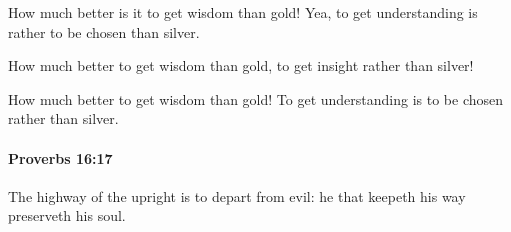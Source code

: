 			\begin{versebox}
					\item[BHS] 
					\item[ASV] How much better is it to get wisdom than gold! Yea, to get understanding is rather to be chosen than silver.
					\item[NIV] How much better to get wisdom than gold, to get insight rather than silver!
					\item[NRSV] How much better to get wisdom than gold! To get understanding is to be chosen rather than silver.
			\end{versebox}

		\paragraph{Proverbs 16:17} %
			\label{PROVERBS-16-17}

			The highway of the upright is to depart from evil: he that keepeth his way preserveth his soul.

